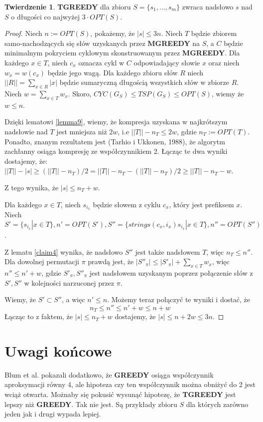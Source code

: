 \documentclass[12pt]{article}
\theoremstyle{definition}
\newtheorem*{theorem}{Twierdzenie}
\begin{document}
\begin{theorem}
\textbf{TGREEDY} dla zbioru $S = \{s_1, ..., s_m \}$ zwraca nadsłowo $s$ nad $S$ o długości co najwyżej $3\cdot OPT(S)$.
\end{theorem}
\begin{proof}
Niech $n:=OPT(S)$, pokażemy, że $|s| \leq 3n$. Niech $T$ będzie zbiorem samo-nachodzących się słów uzyskanych przez \textbf{MGREEDY}
na $S$, a $C$ będzie minimalnym pokryciem cyklowym skonstruowanym przez \textbf{MGREEDY}. Dla każdego $x\in T$, niech $c_x$ oznacza cykl w $C$ odpowiadający 
słowie $x$ oraz niech $w_x = w(c_x)$ będzie jego wagą. Dla każdego zbioru słów $R$ niech $||R|| = \sum_{x\in R}|x|$ będzie 
sumaryczną długością wszystkich słów w zbiorze $R$. Niech $w = \sum_{x\in T} w_x$. Skoro, 
$CYC(G_S) \leq TSP(G_S) \leq OPT(S)$, wiemy że $w \leq n$.

Dzięki lematowi \cref{lemma9}, wiemy, że kompresja uzyskana w najkrótszym nadsłowie nad $T$ jest mniejsza niż $2w$, 
i.e $||T|| - n_T \leq 2w$, gdzie $n_T := OPT(T)$. Ponadto, znanym rezultatem jest (Tarhio i Ukkonen, 1988), że 
algorytm zachłanny osiąga kompresję ze współczynnikiem 2. Łącząc te dwa wyniki dostajemy, że:
$||T|| - |s| \geq (||T|| - n_T)/2 = ||T|| - n_T - (||T||-n_T)/2 \geq ||T|| - n_T - w$.

Z tego wynika, że $|s| \leq n_T + w$.

Dla każdego $x\in T$, niech $s_{i_x}$ będzie słowem z cyklu $c_x$, który jest prefiksem $x$. 
Niech $S' = \{s_{i_x} | x\in T \}, n' = OPT(S'), S'' = \{ strings(c_x, i_x)s_{i_x}|x\in T\}, n'' = OPT(S'')$.

Z lematu \cref{claim4} wynika, że nadsłowo $S''$ jest także nadsłowem $T$, więc $n_T \leq n''$. Dla dowolnej permutacji 
$\pi$ prawdą jest, że $|S''_\pi| \leq |S'_\pi| + \sum_{x\in T}w_x$, więc $n'' \leq n' + w$, gdzie 
$S'_\pi, S''_\pi$ jest nadsłowem uzyskanym poprzez połączenie słów z $S', S''$ w kolejności narzuconej przez $\pi$.

Wiemy, że $S' \subset S''$, a więc $n' \leq n$. Możemy teraz połączyć te wyniki i dostać, że
\[n_T \leq n'' \leq n' + w \leq n + w \]
Łącząc to z faktem, że $|s| \leq n_T + w$ dostajemy, że $|s| \leq n + 2w \leq 3n$.
\end{proof}

\section*{Uwagi końcowe}

Blum et al. pokazali dodatkowo, że \textbf{GREEDY} osiąga współczynnik aproksymacji równy 4, ale hipoteza czy ten współczynnik można obniżyć do 2 jest wciąż otwarta. 
Możnaby się pokusić wysunąć hipotezę, że \textbf{TGREEDY} jest lepszy niż \textbf{GREEDY}. Tak nie jest. Są przykłady zbioru $S$ dla których zarówno jeden jak i drugi wypada lepiej. 
\end{document}
